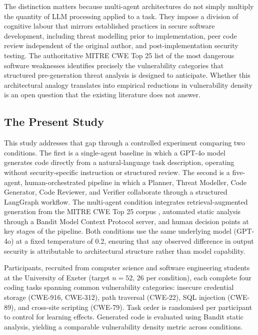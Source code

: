 \documentclass[11pt, a4paper]{article}
\begin{document}
The distinction matters because multi-agent architectures do not simply multiply the quantity of LLM processing applied to a task. They impose a division of cognitive labour that mirrors established practices in secure software development, including threat modelling prior to implementation, peer code review independent of the original author, and post-implementation security testing. The authoritative MITRE CWE Top 25 list of the most dangerous software weaknesses \citep{mitre2024} identifies precisely the vulnerability categories that structured pre-generation threat analysis is designed to anticipate. Whether this architectural analogy translates into empirical reductions in vulnerability density is an open question that the existing literature does not answer.

\subsection*{The Present Study}

This study addresses that gap through a controlled experiment comparing two conditions. The first is a single-agent baseline in which a GPT-4o model generates code directly from a natural-language task description, operating without security-specific instruction or structured review. The second is a five-agent, human-orchestrated pipeline in which a Planner, Threat Modeller, Code Generator, Code Reviewer, and Verifier collaborate through a structured LangGraph workflow. The multi-agent condition integrates retrieval-augmented generation from the MITRE CWE Top 25 corpus \citep{mitre2024}, automated static analysis through a Bandit Model Context Protocol server, and human decision points at key stages of the pipeline. Both conditions use the same underlying model (GPT-4o) at a fixed temperature of 0.2, ensuring that any observed difference in output security is attributable to architectural structure rather than model capability.

Participants, recruited from computer science and software engineering students at the University of Exeter (target $n = 52$, 26 per condition), each complete four coding tasks spanning common vulnerability categories: insecure credential storage (CWE-916, CWE-312), path traversal (CWE-22), SQL injection (CWE-89), and cross-site scripting (CWE-79). Task order is randomised per participant to control for learning effects. Generated code is evaluated using Bandit static analysis, yielding a comparable vulnerability density metric across conditions.
\end{document}
